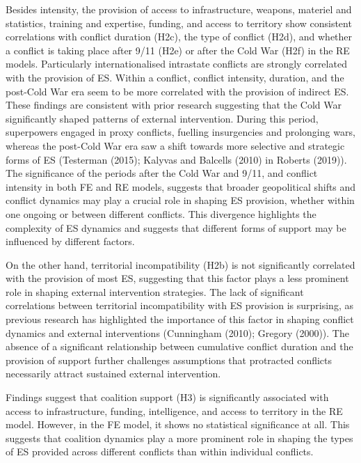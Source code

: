 \documentclass[
]{article}
\begin{document}
Besides intensity, the provision of access to infrastructure, weapons,
materiel and statistics, training and expertise, funding, and access to
territory show consistent correlations with conflict duration (H2c), the
type of conflict (H2d), and whether a conflict is taking place after
9/11 (H2e) or after the Cold War (H2f) in the RE models. Particularly
internationalised intrastate conflicts are strongly correlated with the
provision of ES. Within a conflict, conflict intensity, duration, and
the post-Cold War era seem to be more correlated with the provision of
indirect ES. These findings are consistent with prior research
suggesting that the Cold War significantly shaped patterns of external
intervention. During this period, superpowers engaged in proxy
conflicts, fuelling insurgencies and prolonging wars, whereas the
post-Cold War era saw a shift towards more selective and strategic forms
of ES (Testerman (2015); Kalyvas and Balcells (2010) in Roberts (2019)).
The significance of the periods after the Cold War and 9/11, and
conflict intensity in both FE and RE models, suggests that broader
geopolitical shifts and conflict dynamics may play a crucial role in
shaping ES provision, whether within one ongoing or between different
conflicts. This divergence highlights the complexity of ES dynamics and
suggests that different forms of support may be influenced by different
factors.

On the other hand, territorial incompatibility (H2b) is not
significantly correlated with the provision of most ES, suggesting that
this factor plays a less prominent role in shaping external intervention
strategies. The lack of significant correlations between territorial
incompatibility with ES provision is surprising, as previous research
has highlighted the importance of this factor in shaping conflict
dynamics and external interventions (Cunningham (2010); Gregory (2000)).
The absence of a significant relationship between cumulative conflict
duration and the provision of support further challenges assumptions
that protracted conflicts necessarily attract sustained external
intervention.

Findings suggest that coalition support (H3) is significantly associated
with access to infrastructure, funding, intelligence, and access to
territory in the RE model. However, in the FE model, it shows no
statistical significance at all. This suggests that coalition dynamics
play a more prominent role in shaping the types of ES provided across
different conflicts than within individual conflicts.
\end{document}
